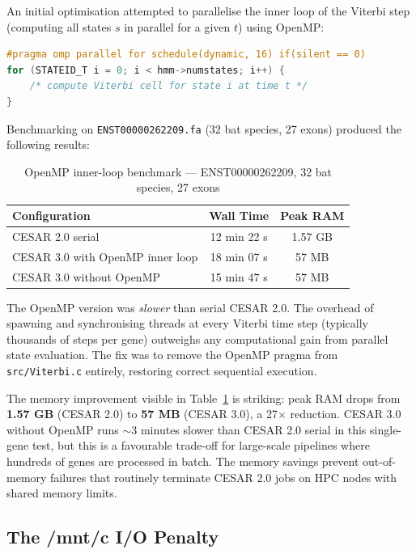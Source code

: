 \documentclass[12pt,a4paper]{article}
\begin{document}
An initial optimisation attempted to parallelise the inner loop of the Viterbi step
(computing all states $s$ in parallel for a given $t$) using OpenMP:

\begin{lstlisting}[language=C]
#pragma omp parallel for schedule(dynamic, 16) if(silent == 0)
for (STATEID_T i = 0; i < hmm->numstates; i++) {
    /* compute Viterbi cell for state i at time t */
}
\end{lstlisting}

Benchmarking on \texttt{ENST00000262209.fa} (32 bat species, 27 exons) produced the
following results:

\begin{table}[h!]
\centering
\caption{OpenMP inner-loop benchmark --- ENST00000262209, 32 bat species, 27 exons}
\label{table3}
\begin{tabular}{lcc}
\toprule
\textbf{Configuration} & \textbf{Wall Time} & \textbf{Peak RAM} \\
\midrule
CESAR 2.0 serial                 & 12 min 22 s & 1.57 GB \\
CESAR 3.0 with OpenMP inner loop & 18 min 07 s &   57 MB \\
CESAR 3.0 without OpenMP         & 15 min 47 s &   57 MB \\
\bottomrule
\end{tabular}
\end{table}

The OpenMP version was \textit{slower} than serial CESAR 2.0. The overhead of spawning
and synchronising threads at every Viterbi time step (typically thousands of steps per
gene) outweighs any computational gain from parallel state evaluation. The fix was to
remove the OpenMP pragma from \texttt{src/Viterbi.c} entirely, restoring correct
sequential execution.

The memory improvement visible in Table~\ref{table3} is striking: peak RAM drops
from \textbf{1.57 GB} (CESAR 2.0) to \textbf{57 MB} (CESAR 3.0), a 27$\times$
reduction. CESAR 3.0 without OpenMP runs $\sim$3 minutes slower than CESAR 2.0 serial
in this single-gene test, but this is a favourable trade-off for large-scale pipelines
where hundreds of genes are processed in batch. The memory savings prevent
out-of-memory failures that routinely terminate CESAR 2.0 jobs on HPC nodes with
shared memory limits.

\subsection{The /mnt/c I/O Penalty}
\end{document}
